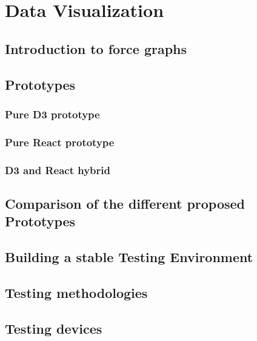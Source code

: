 \chapter{Data Visualization}
\label{cha:visualization}

\section{Introduction to force graphs}

\section{Prototypes}

\subsection{Pure D3 prototype}

\subsection{Pure React prototype}

\subsection{D3 and React hybrid}

\section{Comparison of the different proposed Prototypes}

\section{Building a stable Testing Environment}

\section{Testing methodologies}

\section{Testing devices}
